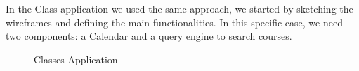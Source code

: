 \documentclass[]{usiinfbachelorproject}
\begin{document}
In the Class application we used the same approach, we started by sketching the wireframes and defining the main functionalities. In this specific case, we need two components: a Calendar and a query engine to search courses. 
\begin{figure}[H]
  \centering
  \hfill
    \caption{Classes Application}
\end{figure}
\end{document}
